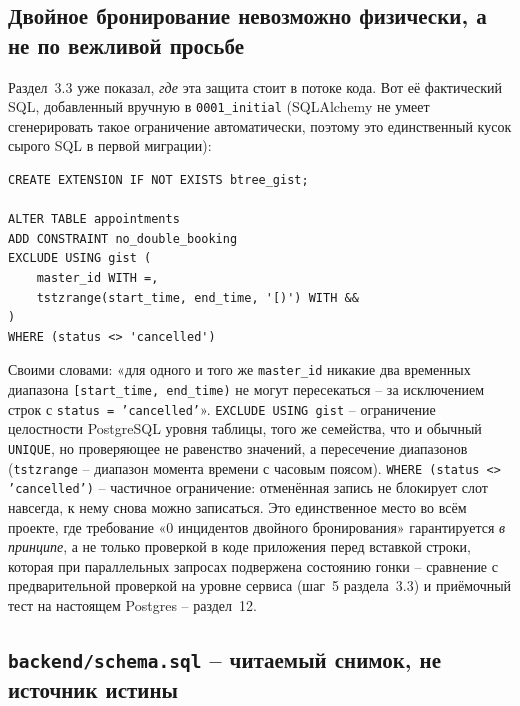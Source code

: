 \subsection{Двойное бронирование невозможно физически, а не по вежливой просьбе}

Раздел~3.3 уже показал, \emph{где} эта защита стоит в потоке кода. Вот её
фактический SQL, добавленный вручную в \texttt{0001_initial} (SQLAlchemy
не умеет сгенерировать такое ограничение автоматически, поэтому это
единственный кусок сырого SQL в первой миграции):
\begin{verbatim}
CREATE EXTENSION IF NOT EXISTS btree_gist;

ALTER TABLE appointments
ADD CONSTRAINT no_double_booking
EXCLUDE USING gist (
    master_id WITH =,
    tstzrange(start_time, end_time, '[)') WITH &&
)
WHERE (status <> 'cancelled')
\end{verbatim}
Своими словами: «для одного и того же \texttt{master_id} никакие два
временных диапазона \texttt{[start_time, end_time)} не могут
пересекаться -- за исключением строк с \texttt{status = 'cancelled'}».
\texttt{EXCLUDE USING gist} -- ограничение целостности PostgreSQL уровня
таблицы, того же семейства, что и обычный \texttt{UNIQUE}, но
проверяющее не равенство значений, а пересечение диапазонов
(\texttt{tstzrange} -- диапазон момента времени с часовым поясом).
\texttt{WHERE (status <> 'cancelled')} -- частичное ограничение: отменённая
запись не блокирует слот навсегда, к нему снова можно записаться. Это
единственное место во всём проекте, где требование «0 инцидентов
двойного бронирования» гарантируется \emph{в принципе}, а не только
проверкой в коде приложения перед вставкой строки, которая при
параллельных запросах подвержена состоянию гонки -- сравнение с
предварительной проверкой на уровне сервиса (шаг~5 раздела~3.3) и
приёмочный тест на настоящем Postgres -- раздел~12.

\subsection{\texttt{backend/schema.sql} -- читаемый снимок, не источник истины}

